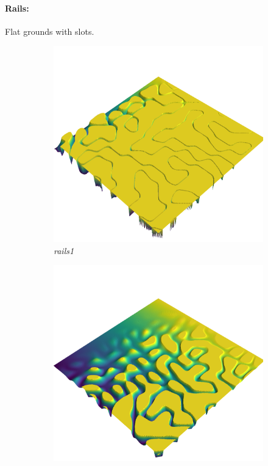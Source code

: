 \documentclass[../document.tex]{subfiles}
\begin{document}
\paragraph{Rails:} Flat grounds with slots.
\begin{figure}[H]
    \centering
        \begin{subfigure}[b]{0.32\textwidth}
            \includegraphics[width=\textwidth]{../img/hm3d/rails1.png}
            \caption{\emph{rails1}}
        \end{subfigure}
        \begin{subfigure}[b]{0.32\linewidth}
            \includegraphics[width=\textwidth]{../img/hm3d/rails2.png}

\end{subfigure}
\end{figure}
\end{document}
